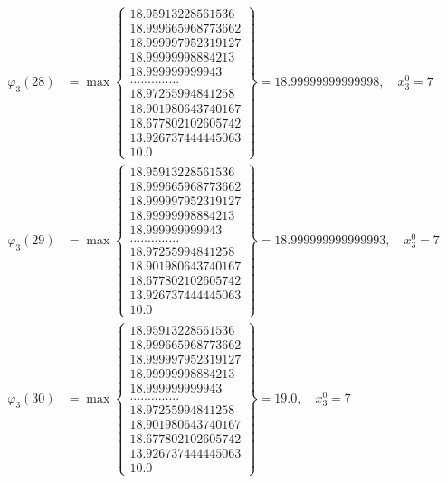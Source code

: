 \documentclass{article}
\begin{document}
\begin{align*}
  
  
  
\varphi_{3}(28) &= \max \left\{ \begin{array}{c}
18.95913228561536 \\
 18.999665968773662 \\
 18.999997952319127 \\
 18.99999998884213 \\
 18.999999999943 \\
 .............. \\
 18.97255994841258 \\
 18.901980643740167 \\
 18.677802102605742 \\
 13.926737444445063 \\
 10.0
\end{array} \right\} = 18.99999999999998, \quad x_{3}^0 = 7\\
  
  
  
  
\varphi_{3}(29) &= \max \left\{ \begin{array}{c}
18.95913228561536 \\
 18.999665968773662 \\
 18.999997952319127 \\
 18.99999998884213 \\
 18.999999999943 \\
 .............. \\
 18.97255994841258 \\
 18.901980643740167 \\
 18.677802102605742 \\
 13.926737444445063 \\
 10.0
\end{array} \right\} = 18.999999999999993, \quad x_{3}^0 = 7\\
  
  
  
  
\varphi_{3}(30) &= \max \left\{ \begin{array}{c}
18.95913228561536 \\
 18.999665968773662 \\
 18.999997952319127 \\
 18.99999998884213 \\
 18.999999999943 \\
 .............. \\
 18.97255994841258 \\
 18.901980643740167 \\
 18.677802102605742 \\
 13.926737444445063 \\
 10.0
\end{array} \right\} = 19.0, \quad x_{3}^0 = 7\\
  

\end{align*}
\end{document}

